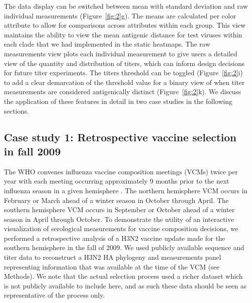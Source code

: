 \documentclass[utf8]{FrontiersinHarvard} %
\begin{document}
The data display can be switched between mean with standard deviation and raw individual measurements (Figure~\ref{fig:2}g).
The means are calculated per color attribute to allow for comparisons across attributes within each group.
This view maintains the ability to view the mean antigenic distance for test viruses within each clade that we had implemented in the static heatmaps.
The raw measurements view plots each individual measurement to give users a detailed view of the quantity and distribution of titers, which can inform design decisions for future titer experiments.
The titers threshold can be toggled (Figure~\ref{fig:2}i) to add a clear demarcation of the threshold value for a binary view of when titer measurements are considered antigenically distinct (Figure~\ref{fig:2}k).
We discuss the application of these features in detail in two case studies in the following sections.

\subsection{Case study 1: Retrospective vaccine selection in fall 2009}

The WHO convenes influenza vaccine composition meetings (VCMs) twice per year with each meeting occurring approximately 9 months prior to the next influenza season in a given hemisphere \citep{Morris:2017ea}.
The northern hemisphere VCM occurs in February or March ahead of a winter season in October through April.
The southern hemisphere VCM occurs in September or October ahead of a winter season in April through October.
To demonstrate the utility of an interactive visualization of serological measurements for vaccine composition decisions, we performed a retrospective analysis of a H3N2 vaccine update made for the southern hemisphere in the fall of 2009.
We used publicly available sequence and titer data \citep{Bedford:2014bf} to reconstruct a H3N2 HA phylogeny and measurements panel representing information that was available at the time of the VCM (see Methods).
We note that the actual selection process used a richer dataset which is not publicly available to include here, and as such these data should be seen as representative of the process only.
\end{document}
